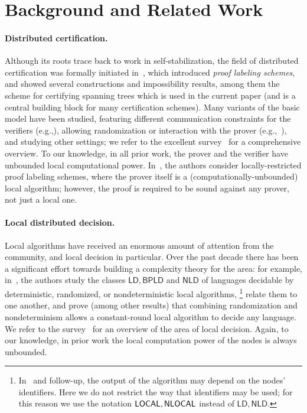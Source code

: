 \section{Background and Related Work}
\label{sec:related}

\paragraph{Distributed certification.}
Although its roots trace back to work in self-stabilization,
the field of distributed certification was formally initiated in~\cite{korman2005proof},
which introduced \emph{proof labeling schemes}, and showed several constructions and impossibility results,
among them the scheme for certifying spanning trees which is used in the current paper (and is
a central building block for many certification schemes).
Many variants of the basic model have been studied, featuring different communication constraints
for the verifiers (e.g.,\cite{ostrovsky2017space,patt2017proof,FFHPP21}),
allowing randomization or interaction with the prover (e.g.,~\cite{baruch2015randomized,KOS18,NPY20}),
and studying other settings;
we refer to the excellent survey~\cite{CertSurvey} for a comprehensive overview.
To our knowledge, in all prior work, the prover and the verifier have unbounded local computational power.
%
In~\cite{EGK22}, the authors consider {locally-restricted proof labeling schemes},
where the prover itself is a (computationally-unbounded) local algorithm;
however, the proof is required to be sound against any prover, not just a local one.

\paragraph{Local distributed decision.}
Local algorithms have received an enormous amount of attention from the community,
and local decision in particular.
Over the past decade there has been a significant effort towards building
a complexity theory for the area: for example, in~\cite{fraigniaud2013towards},
the authors study the classes $\mathsf{LD}, \mathsf{BPLD}$ and $\mathsf{NLD}$ of languages decidable
by deterministic, randomized, or nondeterministic local algorithms,%
\footnote{In~\cite{fraigniaud2013towards} and follow-up, the output
of the algorithm may depend on the nodes' identifiers.
Here we do not restrict the way that identifiers may be used;
for this reason we use the notation ${\mathsf{LOCAL}}, {\mathsf{NLOCAL}}$
instead of $\mathsf{LD}, \mathsf{NLD}$.}
relate them to one another, and prove (among other results) that combining randomization
and nondeterminism allows a constant-round local algorithm to decide any language.
We refer to the survey~\cite{LDSurvey} for an overview of the area of local decision.
Again, to our knowledge, in prior work the local computation power of the nodes is
always unbounded.
